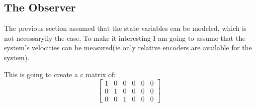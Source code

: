 \subsection{The Observer}
The previous section assumed that the state variables can be modeled, which is not necessaryily the case. To make
it interesting I am going to assume that the system's velocities can be measured(ie only relative encoders are
available for the system).

This is going to create a c matrix of:
\begin{equation}
\begin{bmatrix}
1 & 0 & 0 & 0 & 0 & 0\\
0 & 1 & 0 & 0 & 0 & 0\\
0 & 0 & 1 & 0 & 0 & 0
\end{bmatrix}\end{equation}


